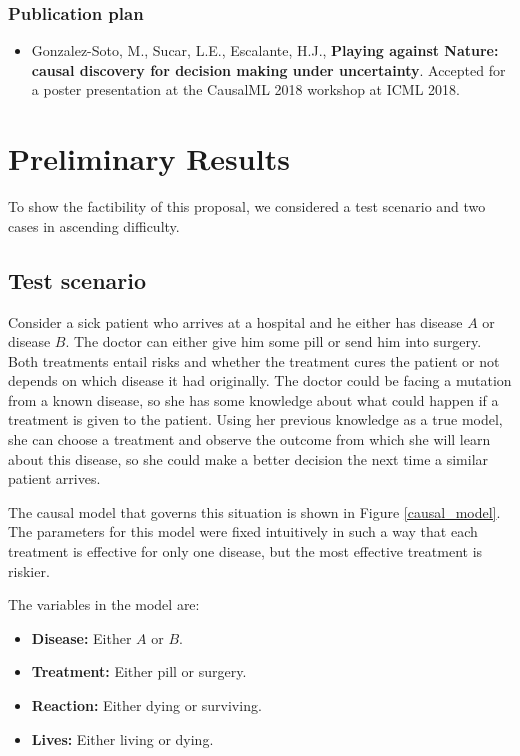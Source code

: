 \documentclass[11pt]{article}
\theoremstyle{plain}
\begin{document}
\subsubsection{Publication plan}
\begin{itemize}
\item Gonzalez-Soto, M., Sucar, L.E., Escalante, H.J., \textbf{Playing against Nature: causal discovery for decision making under uncertainty}. Accepted for a poster presentation at the CausalML 2018 workshop at ICML 2018.
\end{itemize}

\newpage
\section{Preliminary Results}
To show the factibility of this proposal, we considered a test scenario and two cases in ascending difficulty.
\subsection{Test scenario}
Consider a sick patient who arrives at a hospital and he either has disease $A$ or disease $B$. The doctor can either give him some pill or send him into surgery.  Both treatments entail risks and whether the treatment cures the patient or not depends on which disease it had originally. The doctor could be facing a mutation from a known disease, so she has some knowledge about what could happen if a treatment is given to the patient. Using her previous knowledge as a true model, she can choose a treatment and observe the outcome from which she will learn about this disease, so she could make a better decision the next time a similar patient arrives.

The causal model that governs this situation is shown in Figure \ref{causal_model}. The parameters for this model were fixed intuitively in such a way that each treatment is effective for only one disease, but the most effective treatment is riskier.

The variables in the model are: 
\begin{itemize}
\item \textbf{Disease:} Either $A$ or $B$.
\item \textbf{Treatment:} Either pill or surgery.
\item \textbf{Reaction:} Either dying or surviving.
\item \textbf{Lives:} Either living or dying.
\end{itemize}
\end{document}
